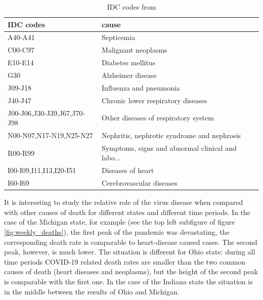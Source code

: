 \documentclass[conference]{IEEEtran}
\begin{document}
\begin{table}
  \centering
  \begin{tabular}{ll}
\toprule
IDC codes&                                              cause \\
\midrule
A40-A41                     &                                        Septicemia  \\
C00-C97                     &                               Malignant neoplasms  \\
E10-E14                     &                                 Diabetes mellitus  \\
G30                         &                                 Alzheimer disease  \\
J09-J18                     &                           Influenza and pneumonia  \\
J40-J47                     &                Chronic lower respiratory diseases  \\
J00-J06,J30-J39,J67,J70-J98 &              Other diseases of respiratory system  \\
N00-N07,N17-N19,N25-N27     &       Nephritis, nephrotic syndrome and nephrosis  \\
R00-R99                     &  Symptoms, signs and abnormal clinical and labo... \\
I00-I09,I11,I13,I20-I51     &                                 Diseases of heart  \\
I60-I69                     &                          Cerebrovascular diseases  \\
\bottomrule
\end{tabular}
\caption{IDC codes from \cite{cdc_international_nodate}}
\label{tab:IDC_codes}
\end{table}


It is interesting to study the relative role of the virus disease when compared with other causes of death for different states and different time periods. In the case of the Michigan state, for example (see the top left subfigure of figure \ref{fig:weekly_deaths}), the first peak of the pandemic was devastating, the corresponding death rate is comparable to heart-disease caused cases. The second peak, however, is much lower. The situation is different for Ohio state: during all time periods COVID-19 related death rates are smaller than the two common causes of death (heart diseases and neoplasms), but the height of the second peak is comparable with the first one. In the case of the Indiana state the situation is in the middle between the results of Ohio and Michigan.
\end{document}
